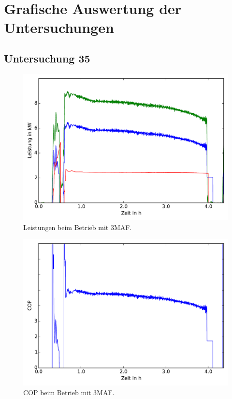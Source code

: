 \chapter{Grafische Auswertung der Untersuchungen}

\section{Untersuchung 35}

\begin{figure}[h!]
\centering
\includegraphics[scale=0.8]{Pictures/35/Qdots_lastCycle.pdf}
\caption{Leistungen beim Betrieb mit 3MAF.}
\label{fig:Leistungen35}
\end{figure}

\begin{figure}[h!]
\centering
\includegraphics[scale=0.8]{Pictures/35/COP_lastCycle.pdf}
\caption{COP beim Betrieb mit 3MAF.}
\label{fig:COP35}
\end{figure}

